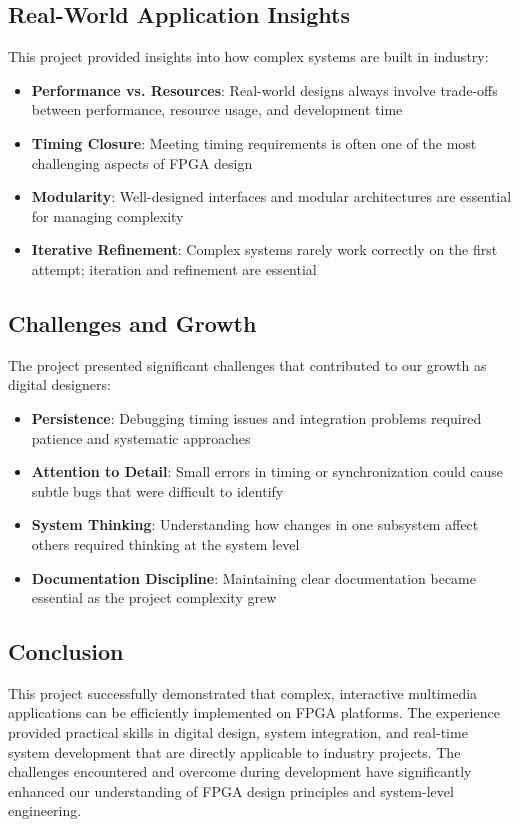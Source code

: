 \documentclass[12pt,a4paper]{article}
\begin{document}
\subsection{Real-World Application Insights}

This project provided insights into how complex systems are built in industry:
\begin{itemize}
    \item \textbf{Performance vs. Resources}: Real-world designs always involve trade-offs between performance, resource usage, and development time
    \item \textbf{Timing Closure}: Meeting timing requirements is often one of the most challenging aspects of FPGA design
    \item \textbf{Modularity}: Well-designed interfaces and modular architectures are essential for managing complexity
    \item \textbf{Iterative Refinement}: Complex systems rarely work correctly on the first attempt; iteration and refinement are essential
\end{itemize}

\subsection{Challenges and Growth}

The project presented significant challenges that contributed to our growth as digital designers:
\begin{itemize}
    \item \textbf{Persistence}: Debugging timing issues and integration problems required patience and systematic approaches
    \item \textbf{Attention to Detail}: Small errors in timing or synchronization could cause subtle bugs that were difficult to identify
    \item \textbf{System Thinking}: Understanding how changes in one subsystem affect others required thinking at the system level
    \item \textbf{Documentation Discipline}: Maintaining clear documentation became essential as the project complexity grew
\end{itemize}

\subsection{Conclusion}

This project successfully demonstrated that complex, interactive multimedia applications can be efficiently implemented on FPGA platforms. The experience provided practical skills in digital design, system integration, and real-time system development that are directly applicable to industry projects. The challenges encountered and overcome during development have significantly enhanced our understanding of FPGA design principles and system-level engineering.
\end{document}
